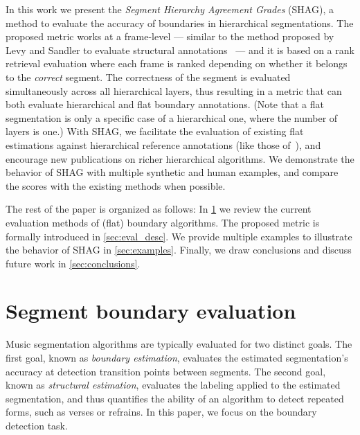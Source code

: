 \documentclass{article}
\begin{document}

In this work we present the \emph{Segment Hierarchy Agreement Grades} (SHAG), a method to evaluate the accuracy of boundaries in hierarchical segmentations.
The proposed metric works at a frame-level --- similar to the method proposed by Levy and Sandler to evaluate structural annotations~\cite{Levy2008} --- and it is based on a rank retrieval evaluation where each frame is ranked depending on whether it belongs to the \emph{correct} segment.
The correctness of the segment is evaluated simultaneously across all hierarchical layers, thus resulting in a metric that can both evaluate hierarchical and flat boundary annotations. 
(Note that a flat segmentation is only a specific case of a hierarchical one, where the number of layers is one.)
With SHAG, we facilitate the evaluation of existing flat estimations against hierarchical reference annotations (like those of~\cite{Smith2011}), and encourage new publications on richer hierarchical algorithms.
We demonstrate the behavior of SHAG with multiple synthetic and human examples, and compare the scores with the existing methods when possible.


The rest of the paper is organized as follows: In \cref{sec:curr_meth} we review the current evaluation methods of (flat) boundary algorithms. 
The proposed metric is formally introduced in \cref{sec:eval_desc}. 
We provide multiple examples to illustrate the behavior of SHAG in \cref{sec:examples}.
Finally, we draw conclusions and discuss future work in \cref{sec:conclusions}.

\section{Segment boundary evaluation}\label{sec:curr_meth}

Music segmentation algorithms are typically evaluated for two distinct goals.  
The first goal, known as \emph{boundary estimation}, evaluates the estimated segmentation's accuracy at detection transition points between segments.
The second goal, known as \emph{structural estimation}, evaluates the labeling applied to the estimated segmentation, and thus quantifies the ability of an algorithm to detect repeated
forms, such as verses or refrains.  In this paper, we focus on the boundary detection task.
\end{document}
